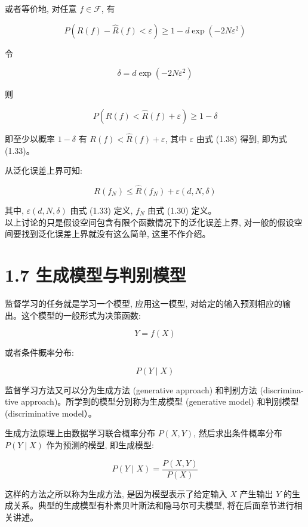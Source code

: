 \documentclass[10pt]{article}
\begin{document}
或者等价地, 对任意 $f \in \mathcal{F}$, 有


\begin{equation*}
P(R(f)-\hat{R}(f)<\varepsilon) \geqslant 1-d \exp \left(-2 N \varepsilon^{2}\right) \tag{1.37}
\end{equation*}


令


\begin{equation*}
\delta=d \exp \left(-2 N \varepsilon^{2}\right) \tag{1.38}
\end{equation*}


则

$$
P(R(f)<\hat{R}(f)+\varepsilon) \geqslant 1-\delta
$$

即至少以概率 $1-\delta$ 有 $R(f)<\hat{R}(f)+\varepsilon$, 其中 $\varepsilon$ 由式 (1.38) 得到, 即为式 (1.33)。

从泛化误差上界可知:


\begin{equation*}
R\left(f_{N}\right) \leqslant \hat{R}\left(f_{N}\right)+\varepsilon(d, N, \delta) \tag{1.39}
\end{equation*}


其中, $\varepsilon(d, N, \delta)$ 由式 (1.33) 定义, $f_{N}$ 由式 (1.30) 定义。\\
以上讨论的只是假设空间包含有限个函数情况下的泛化误差上界, 对一般的假设空间要找到泛化误差上界就没有这么简单, 这里不作介绍。

\section*{1.7 生成模型与判别模型}
监督学习的任务就是学习一个模型, 应用这一模型, 对给定的输入预测相应的输出。这个模型的一般形式为决策函数:

$$
Y=f(X)
$$

或者条件概率分布:

$$
P(Y \mid X)
$$

监督学习方法又可以分为生成方法 (generative approach) 和判别方法 (discrimina-tive approach)。所学到的模型分别称为生成模型 (generative model) 和判别模型 (discriminative model）。

生成方法原理上由数据学习联合概率分布 $P(X, Y)$, 然后求出条件概率分布 $P(Y \mid X)$ 作为预测的模型, 即生成模型:


\begin{equation*}
P(Y \mid X)=\frac{P(X, Y)}{P(X)} \tag{1.40}
\end{equation*}


这样的方法之所以称为生成方法, 是因为模型表示了给定输入 $X$ 产生输出 $Y$ 的生成关系。典型的生成模型有朴素贝叶斯法和隐马尔可夫模型, 将在后面章节进行相关讲述。
\end{document}

